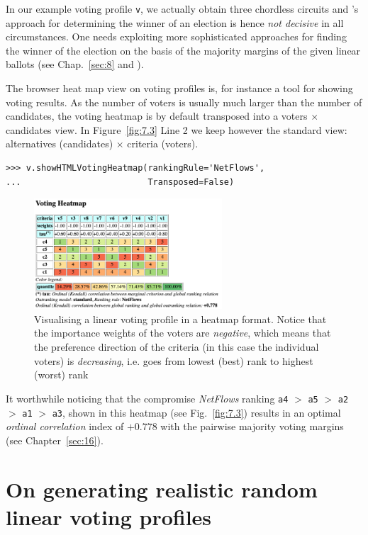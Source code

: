 In our example voting profile \texttt{v}, we actually obtain three chordless circuits and \Condorcet 's approach for determining the winner of an election is hence \emph{not decisive} in all circumstances. One needs exploiting more sophisticated approaches for finding the winner of the election on the basis of the majority margins of the given linear ballots (see Chap.~\ref{sec:8} and \citet{BIS-2008a}). 

The browser heat map view on voting profiles is, for instance a tool for showing voting results. As the number of voters is usually much larger than the number of candidates, the voting heatmap is by default transposed into a voters $\times$ candidates view. In Figure~\vref{fig:7.3} Line 2 we keep however the standard view: alternatives (candidates) $\times$ criteria (voters). 
\begin{lstlisting}
>>> v.showHTMLVotingHeatmap(rankingRule='NetFlows',
...                         Transposed=False)
\end{lstlisting}
\begin{figure}[ht]
\sidecaption[t]
\includegraphics[width=7cm]{Figures/7-3-votingHeatmap.png}
\caption{Visualising a linear voting profile in a heatmap format. Notice that the importance weights of the voters are \emph{negative}, which means that the preference direction of the criteria (in this case the individual voters) is \emph{decreasing}, i.e. goes from lowest (best) rank to highest (worst) rank}
\label{fig:7.3}       %
\end{figure}

It worthwhile noticing that the compromise \emph{NetFlows} ranking \texttt{a4} $>$ \texttt{a5} $>$ \texttt{a2} $>$ \texttt{a1} $>$ \texttt{a3}, shown in this heatmap (see Fig.~\vref{fig:7.3}) results in an optimal \emph{ordinal correlation} index of $+0.778$ with the pairwise majority voting margins (see Chapter~\vref{sec:16}).



\section{On generating realistic random linear voting profiles}
\label{sec:7.5}

